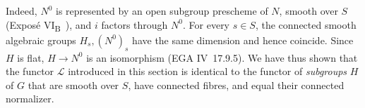 Indeed, \(N^0\) is represented by an open subgroup prescheme of \(N\),
smooth over \(S\) (Exposé VI\textsubscript{B}~), and \(i\)
factors through \(N^0\). For every \(s\in S\), the connected smooth
algebraic groups \(H_s,(N^0)_s\) have the same dimension and hence
coincide. Since \(H\) is flat, \(H\to N^0\) is an isomorphism
(EGA IV~17.9.5). We have thus shown that the functor \(\mathcal L\) introduced in this section
is identical to the functor of \emph{subgroups}
\(H\) of \(G\) that are smooth over \(S\), have connected fibres,
and equal their connected normalizer.
